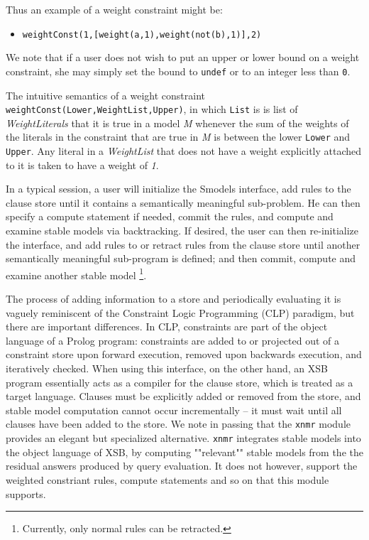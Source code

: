Thus an example of a weight constraint might be: 
\begin{itemize}
\item {\tt weightConst(1,[weight(a,1),weight(not(b),1)],2)}
\end{itemize}
We note that if a user does not wish to put an upper or lower bound on
a weight constraint, she may simply set the bound to {\tt undef} or to
an integer less than {\tt 0}.  
 
The intuitive semantics of a weight constraint
{\tt weightConst(Lower,WeightList,Upper)}, in which {\tt List} is is
list of \emph{WeightLiterals} that it is true in a model \emph{M} whenever
the sum of the weights of the literals in the constraint that are true
in \emph{M} is between the lower {\tt Lower} and {\tt Upper}.  Any literal
in a \emph{WeightList} that does not have a weight explicitly attached
to it is taken to have a weight of \emph{1}.

In a typical session, a user will initialize the Smodels interface,
add rules to the clause store until it contains a semantically
meaningful sub-problem.  He can then specify a compute statement if
needed, commit the rules, and compute and examine stable models via
backtracking.  If desired, the user can then re-initialize the
interface, and add rules to or retract rules from the clause store
until another semantically meaningful sub-program is defined; and then
commit, compute and examine another stable model \footnote{Currently,
only normal rules can be retracted.}.

The process of adding information to a store and periodically
evaluating it is vaguely reminiscent of the Constraint Logic
Programming (CLP) paradigm, but there are important differences.  In
CLP, constraints are part of the object language of a Prolog program:
constraints are added to or projected out of a constraint store upon
forward execution, removed upon backwards execution, and iteratively
checked.  When using this interface, on the other hand, an XSB program
essentially acts as a compiler for the clause store, which is treated
as a target language.  Clauses must be explicitly added or removed
from the store, and stable model computation cannot occur
incrementally -- it must wait until all clauses have been added to the
store.  We note in passing that the {\tt xnmr} module provides an
elegant but specialized alternative.  {\tt xnmr} integrates stable
models into the object language of XSB, by computing ""relevant""
stable models from the the residual answers produced by query
evaluation.  It does not however, support the weighted constriant
rules, compute statements and so on that this module supports.

